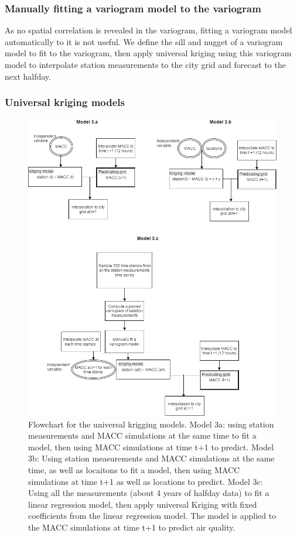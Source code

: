 \documentclass{article}
\begin{document}
\subsubsection{Manually fitting a variogram model to the variogram}
As no spatial correlation is revealed in the variogram, fitting a variogram model automatically to
it is not useful. We define the sill and nugget of a variogram model
to fit to the variogram, then apply universal kriging using this
variogram model to interpolate station measurements to the city grid
and forecast to the next halfday.

\subsubsection{Universal kriging models}

\begin{figure}[tbp]
\includegraphics[width=\columnwidth]{diaM3.png}
\caption{Flowchart for the universal krigging models. Model 3a: using
  station measurements and MACC simulations at the same time to fit a
  model, then using MACC simulations at time t+1 to predict. Model 3b:
  Using station measurements and MACC simulations at the same time, as
  well as locaitons to fit a model, then using MACC simulations at
  time t+1 as well as locations to predict. Model 3c: Using all the
  measurements (about 4 years of halfday data) to fit a linear
  regression model, then apply universal Kriging with fixed
  coefficients from the linear regression model. The model is applied
  to the MACC simulations at time t+1 to predict air quality.}
\label{fig:UK}
\end{figure}
\end{document}
